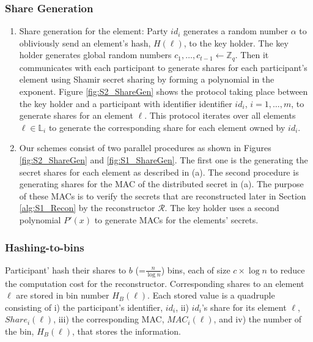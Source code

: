 \subsubsection{Share Generation}\label{ShareGen_S2}
\begin{enumerate}[label=(\alph*)]
    \item Share generation for the element: Party $id_i$ generates a random number $\alpha$ to obliviously send an element's hash, $H(\ell)$, to the key holder. The key holder generates global random numbers $c_1, \dots, c_{t-1} \gets \mathbb{Z}_{q}$. Then it communicates with each participant to generate shares for each participant's element using Shamir secret sharing by forming a polynomial in the exponent. Figure \ref{fig:S2_ShareGen} shows the protocol taking place between the key holder and a participant with identifier identifier $id_i$, $i =1, \dots, m$, to generate shares for an element $\ell$. This protocol iterates over all elements $\ell \in \mathbb{L}_i$ to generate the corresponding share for each element owned by $id_i$.
    \item Our schemes consist of two parallel procedures as shown in Figures \ref{fig:S2_ShareGen} and \ref{fig:S1_ShareGen}. The first one is the generating the secret shares for each element as described in (a). The second procedure is generating shares for the MAC of the distributed secret in (a). The purpose of these MACs is to verify the secrets that are reconstructed later in Section \ref{alg:S1_Recon} by the reconstructor $\mathcal{R}$. The key holder uses a second polynomial $P'(x)$ to generate MACs for the elements' secrets. 
\end{enumerate}

\subsubsection{Hashing-to-bins}\label{Binning_S2} 
Participant' hash their shares to $b$ (=$\frac{n}{\log{n}}$) bins, each of size $c\times \log{n}$ to reduce the computation cost for the reconstructor. Corresponding shares to an element $\ell$ are stored in bin number $H_B(\ell)$. Each stored value is a quadruple consisting of i) the participant's identifier, $id_i$, ii) $id_i$'s share for its element $\ell$, $Share_i(\ell)$, iii) the corresponding MAC, $MAC_i(\ell)$, and iv) the number of the bin, $H_B(\ell)$, that stores the information.

